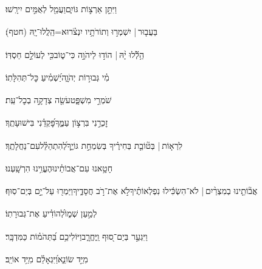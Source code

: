 \documentclass[12pt]{article}
\newcommand{\loc}[1]{\textsuperscript{\locf{#1}}}
\begin{document}
{\loc{ מד}~}‏וַיִּתֵּ֣ן  אַרְצ֣וֹת גּוֹיִ֑ם{\hfill}וַעֲמַ֖ל לְאֻמִּ֣ים יִירָֽשׁוּ׃\par

{\loc{ מה}~}‏בַּעֲב֤וּר |  יִשְׁמְר֣וּ {\hfill}וְתוֹרֹתָ֥יו יִנְצֹ֗רוּ\newline\hspace*{.5em}א=הַֽלֲלוּ־יָֽהּ (חטף)׃\par\pend
\ledpb
\pstart[\subsection*{\textcolor{red}{פרק קו}}]\label{פרק קו}
{\loc{ א}~}‏הַ֥לְﬞלוּ יָ֨הּ | \newline\hspace*{.5em}הוֹד֣וּ לַיהֹוָ֣ה כִּי־ט֑וֹב{\hfill}כִּ֖י לְעוֹלָ֣ם חַסְדּֽוֹ׃\par

{\loc{ ב}~}‏מִ֗י  גְּבוּר֣וֹת יְהֹוָ֑ה{\hfill}יַ֝שְׁמִ֗יעַ כׇּל־תְּהִלָּתֽוֹ׃\par

{\loc{ ג}~}‏ שֹׁמְרֵ֣י מִשְׁפָּ֑ט{\hfill}עֹשֵׂ֖ה צְדָקָ֣ה בְכׇל־עֵֽת׃\par

{\loc{ ד}~}‏זׇכְרֵ֣נִי  בִּרְצ֣וֹן עַמֶּ֑ךָ{\hfill}פׇּ֝קְדֵ֗נִי בִּישׁוּעָתֶֽךָ׃\par

{\loc{ ה}~}‏לִרְא֤וֹת |  בְּט֘וֹבַ֤ת בְּחִירֶ֗יךָ{\hfill} בְּשִׂמְחַ֣ת גּוֹיֶ֑ךָ\newline\hspace*{.5em}לְ֝הִתְהַלֵּ֗ל{\hfill}עִם־נַחֲלָתֶֽךָ׃\par

{\loc{ ו}~}‏חָטָ֥אנוּ עִם־אֲבוֹתֵ֗ינוּ{\hfill}הֶעֱוִ֥ינוּ הִרְשָֽׁעְנוּ׃\par

{\loc{ ז}~}‏אֲב֘וֹתֵ֤ינוּ בְמִצְרַ֨יִם | {\hfill}לֹא־הִשְׂכִּ֬ילוּ נִפְלְאוֹתֶ֗יךָ\newline\hspace*{.5em}לֹ֣א  אֶת־רֹ֣ב חֲסָדֶ֑יךָ{\hfill}וַיַּמְר֖וּ עַל־יָ֣ם בְּיַם־סֽוּף׃\par

{\loc{ ח}~}‏ לְמַ֣עַן שְׁמ֑וֹ{\hfill}לְ֝הוֹדִ֗יעַ אֶת־גְּבוּרָתֽוֹ׃\par

{\loc{ ט}~}‏וַיִּגְעַ֣ר בְּיַם־ס֭וּף וַֽיֶּחֱרָ֑ב{\hfill}וַיּוֹלִיכֵ֥ם בַּ֝תְּהֹמ֗וֹת כַּמִּדְבָּֽר׃\par

{\loc{ י}~}‏ מִיַּ֣ד שׂוֹנֵ֑א{\hfill}וַ֝יִּגְאָלֵ֗ם מִיַּ֥ד אוֹיֵֽב׃\par
\end{document}
